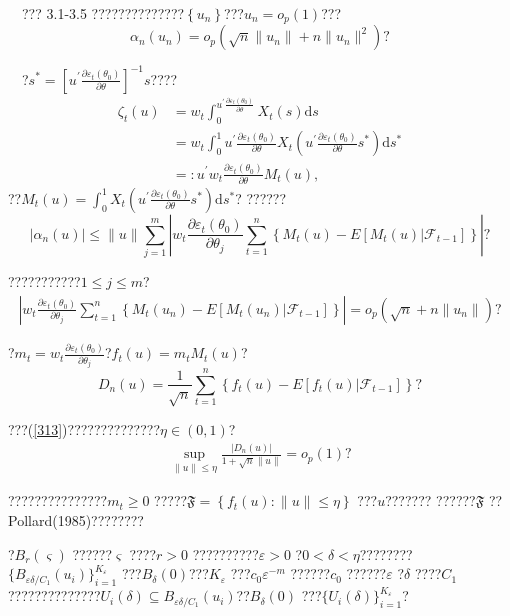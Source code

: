 \documentclass[a4paper,12pt,openany,oneside,utf-8]{ctexbook}
\newcommand{\xiaosihao}{\fontsize{12pt}{\baselineskip}\selectfont}
\begin{document}
	\
	
	\noindent{\xiaosihao\heiti ??~3.4}~~??? 3.1-3.5 ??????????????$\left\{u_n\right\}$???$u_n=o_p(1)$???
	$$\alpha_n(u_n)=o_p(\sqrt{n}\|u_n\|+n\|u_n\|^2)\mbox{?}$$
	
	\noindent{\xiaosihao\heiti ??~3.4??}~~?$s^{\ast}=\left[u^{\prime}\frac{\partial\varepsilon_t(\theta_0)}{\partial\theta}\right]^{-1}s$????
	\begin{align}
		\zeta_t(u)&=w_t\int_0^{u^{\prime}\frac{\partial\varepsilon_t(\theta_0)}{\partial\theta}}X_t(s)\mathrm{d}s\nonumber\\
		&=w_t\int_0^1u^{\prime}\frac{\partial\varepsilon_t(\theta_0)}{\partial\theta}X_t\left(u^{\prime}\frac{\partial\varepsilon_t(\theta_0)}{\partial\theta}s^{\ast}\right) \mathrm{d}s^{\ast}\nonumber \\
		&=:u^{\prime}w_t\frac{\partial\varepsilon_t(\theta_0)}{\partial\theta}M_t(u), \nonumber
	\end{align}
	??$M_t(u)=\int_0^1X_t\left(u^{\prime}\frac{\partial\varepsilon_t(\theta_0)}{\partial\theta}s^{\ast}\right)\mathrm{d}s^{\ast}$? ??????$$|\alpha_n(u)|\le\|u\|\sum_{j=1}^m\left|w_t\frac{\partial\varepsilon_t(\theta_0)}{\partial\theta_j}\sum_{t=1}^n\left\{M_t(u)-E[M_t(u)|\mathcal{F}_{t-1}]\right\}\right|\mbox{?}$$
	
	\noindent ???????????$1\le j \le m$?
	\begin{align}\label{313}
		\left|w_t\frac{\partial\varepsilon_t(\theta_0)}{\partial\theta_j}\sum_{t=1}^n\left\{M_t(u_n)-E[M_t(u_n)|\mathcal{F}_{t-1}]\right\}\right|=o_p(\sqrt{n}+n\|u_n\|)\mbox{?}
	\end{align}
	
	\noindent ?$m_t=w_t\frac{\partial\varepsilon_t(\theta_0)}{\partial\theta_j}$?$f_t(u)=m_t M_t(u)$?
	$$D_n(u)=\frac{1}{\sqrt{n}}\sum_{t=1}^n\left\{f_t(u)-E[f_t(u)|\mathcal{F}_{t-1}]\right\}\mbox{?}$$
	
	\noindent ???(\ref{313})??????????????$\eta\in(0,1)$?
	\begin{align}\label{314}
		\sup_{\|u\|\le\eta}\frac{|D_n(u)|}{1+\sqrt{n}\|u\|}=o_p(1)\mbox{?}
	\end{align}
	
	\noindent ???????????????$m_t\ge 0$ ?????$\mathfrak{F}=\left\{f_t(u):\|u\|\le\eta\right\}$ ???$u $???????
	??????$\mathfrak{F}$ ??Pollard(1985)????????
	
	?$B_r(\varsigma)$ ??????$\varsigma$ ????$r>0$ ??????????$\varepsilon>0$ ?$0<\delta<\eta$????????$\{B_{\varepsilon\delta/C_1}(u_i)\}_{i=1}^{K_\varepsilon}$ ???$B_{\delta}(0)$???$K_{\varepsilon}$ ???$c_0\varepsilon^{-m}$ ??????$c_0$ ??????$\varepsilon$ ?$\delta$ ????$C_1$ ??????????????$U_i(\delta)\subseteq B_{\varepsilon\delta/C_1}(u_i)$??$B_{\delta}(0)$ ???$\{U_i(\delta)\}_{i=1}^{K_\varepsilon}$?
	
\end{document}
